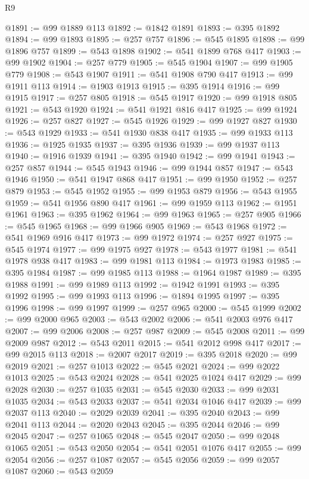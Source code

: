 \begin{lexlean}{R9}
\begin{coremodule}
{{{{{{{{{{{{{{{{{{{{{{{{{{{{{{{{{{{{{{{{{{{{{{{{{{{{{{{{{{{{{{{{{{{{{{{{{{{{{{{{{{{{@1891 := @99 @1889 @113
@1892 := @1842 @1891
@1893 := @395 @1892
@1894 := @99 @1893
@1895 := @257 @757
@1896 := @545 @1895
@1898 := @99 @1896 @757
@1899 := @543 @1898
@1902 := @541 @1899 @768 @417
@1903 := @99 @1902
@1904 := @257 @779
@1905 := @545 @1904
@1907 := @99 @1905 @779
@1908 := @543 @1907
@1911 := @541 @1908 @790 @417
@1913 := @99 @1911 @113
@1914 := @1903 @1913
@1915 := @395 @1914
@1916 := @99 @1915
@1917 := @257 @805
@1918 := @545 @1917
@1920 := @99 @1918 @805
@1921 := @543 @1920
@1924 := @541 @1921 @816 @417
@1925 := @99 @1924
@1926 := @257 @827
@1927 := @545 @1926
@1929 := @99 @1927 @827
@1930 := @543 @1929
@1933 := @541 @1930 @838 @417
@1935 := @99 @1933 @113
@1936 := @1925 @1935
@1937 := @395 @1936
@1939 := @99 @1937 @113
@1940 := @1916 @1939
@1941 := @395 @1940
@1942 := @99 @1941
@1943 := @257 @857
@1944 := @545 @1943
@1946 := @99 @1944 @857
@1947 := @543 @1946
@1950 := @541 @1947 @868 @417
@1951 := @99 @1950
@1952 := @257 @879
@1953 := @545 @1952
@1955 := @99 @1953 @879
@1956 := @543 @1955
@1959 := @541 @1956 @890 @417
@1961 := @99 @1959 @113
@1962 := @1951 @1961
@1963 := @395 @1962
@1964 := @99 @1963
@1965 := @257 @905
@1966 := @545 @1965
@1968 := @99 @1966 @905
@1969 := @543 @1968
@1972 := @541 @1969 @916 @417
@1973 := @99 @1972
@1974 := @257 @927
@1975 := @545 @1974
@1977 := @99 @1975 @927
@1978 := @543 @1977
@1981 := @541 @1978 @938 @417
@1983 := @99 @1981 @113
@1984 := @1973 @1983
@1985 := @395 @1984
@1987 := @99 @1985 @113
@1988 := @1964 @1987
@1989 := @395 @1988
@1991 := @99 @1989 @113
@1992 := @1942 @1991
@1993 := @395 @1992
@1995 := @99 @1993 @113
@1996 := @1894 @1995
@1997 := @395 @1996
@1998 := @99 @1997
@1999 := @257 @965
@2000 := @545 @1999
@2002 := @99 @2000 @965
@2003 := @543 @2002
@2006 := @541 @2003 @976 @417
@2007 := @99 @2006
@2008 := @257 @987
@2009 := @545 @2008
@2011 := @99 @2009 @987
@2012 := @543 @2011
@2015 := @541 @2012 @998 @417
@2017 := @99 @2015 @113
@2018 := @2007 @2017
@2019 := @395 @2018
@2020 := @99 @2019
@2021 := @257 @1013
@2022 := @545 @2021
@2024 := @99 @2022 @1013
@2025 := @543 @2024
@2028 := @541 @2025 @1024 @417
@2029 := @99 @2028
@2030 := @257 @1035
@2031 := @545 @2030
@2033 := @99 @2031 @1035
@2034 := @543 @2033
@2037 := @541 @2034 @1046 @417
@2039 := @99 @2037 @113
@2040 := @2029 @2039
@2041 := @395 @2040
@2043 := @99 @2041 @113
@2044 := @2020 @2043
@2045 := @395 @2044
@2046 := @99 @2045
@2047 := @257 @1065
@2048 := @545 @2047
@2050 := @99 @2048 @1065
@2051 := @543 @2050
@2054 := @541 @2051 @1076 @417
@2055 := @99 @2054
@2056 := @257 @1087
@2057 := @545 @2056
@2059 := @99 @2057 @1087
@2060 := @543 @2059
}}}}}}}}}}}}}}}}}}}}}}}}}}}}}}}}}}}}}}}}}}}}}}}}}}}}}}}}}}}}}}}}}}}}}}}}}}}}}}}}}}}}
\end{coremodule}
\end{lexlean}
